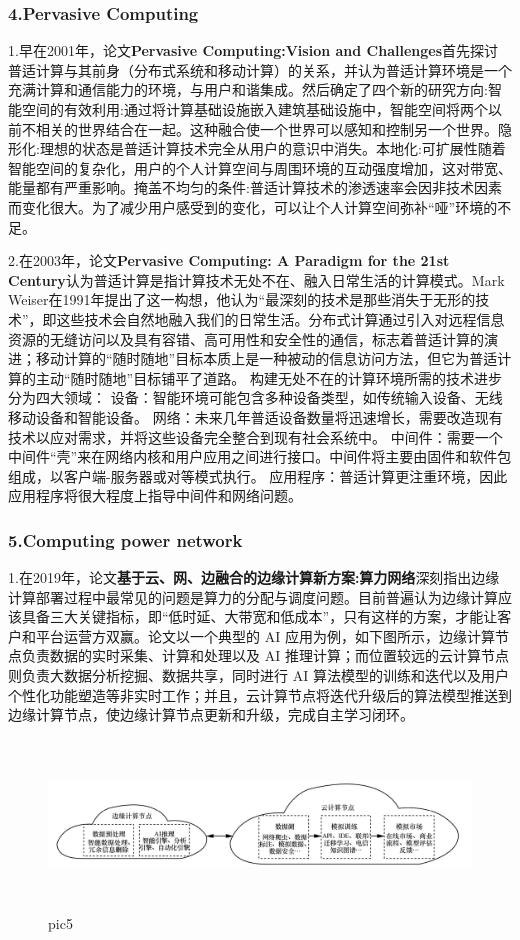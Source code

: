 \documentclass[a4paper,twoside]{scrbook}
\begin{document}
\subsubsection{4.Pervasive Computing}

1.早在2001年，论文\textbf{Pervasive Computing:Vision and Challenges}首先探讨普适计算与其前身（分布式系统和移动计算）的关系，并认为普适计算环境是一个充满计算和通信能力的环境，与用户和谐集成。然后确定了四个新的研究方向:智能空间的有效利用:通过将计算基础设施嵌入建筑基础设施中，智能空间将两个以前不相关的世界结合在一起。这种融合使一个世界可以感知和控制另一个世界。隐形化:理想的状态是普适计算技术完全从用户的意识中消失。本地化:可扩展性随着智能空间的复杂化，用户的个人计算空间与周围环境的互动强度增加，这对带宽、能量都有严重影响。掩盖不均匀的条件:普适计算技术的渗透速率会因非技术因素而变化很大。为了减少用户感受到的变化，可以让个人计算空间弥补“哑”环境的不足。

2.在2003年，论文\textbf{Pervasive Computing: A Paradigm for the 21st Century}认为普适计算是指计算技术无处不在、融入日常生活的计算模式。Mark Weiser在1991年提出了这一构想，他认为“最深刻的技术是那些消失于无形的技术”，即这些技术会自然地融入我们的日常生活。分布式计算通过引入对远程信息资源的无缝访问以及具有容错、高可用性和安全性的通信，标志着普适计算的演进；移动计算的“随时随地”目标本质上是一种被动的信息访问方法，但它为普适计算的主动“随时随地”目标铺平了道路。
构建无处不在的计算环境所需的技术进步分为四大领域：
设备：智能环境可能包含多种设备类型，如传统输入设备、无线移动设备和智能设备。
网络：未来几年普适设备数量将迅速增长，需要改造现有技术以应对需求，并将这些设备完全整合到现有社会系统中。
中间件：需要一个中间件“壳”来在网络内核和用户应用之间进行接口。中间件将主要由固件和软件包组成，以客户端-服务器或对等模式执行。
应用程序：普适计算更注重环境，因此应用程序将很大程度上指导中间件和网络问题。

\subsubsection{5.Computing power network}

1.在2019年，论文\textbf{基于云、网、边融合的边缘计算新方案:算力网络}深刻指出边缘计算部署过程中最常见的问题是算力的分配与调度问题。目前普遍认为边缘计算应该具备三大关键指标，即“低时延、大带宽和低成本”，只有这样的方案，才能让客户和平台运营方双赢。论文以一个典型的 AI 应用为例，如下图所示，边缘计算节点负责数据的实时采集、计算和处理以及 AI 推理计算；而位置较远的云计算节点则负责大数据分析挖掘、数据共享，同时进行 AI 算法模型的训练和迭代以及用户个性化功能塑造等非实时工作；并且，云计算节点将迭代升级后的算法模型推送到边缘计算节点，使边缘计算节点更新和升级，完成自主学习闭环。
\begin{figure}
\centering %
\includegraphics[height=4.5cm,width=13.5cm]{AI c e.png}
\caption{pic5}
\end{figure}
\end{document}

